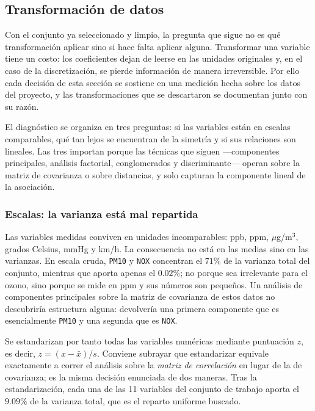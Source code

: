 \subsection{Transformación de datos}

Con el conjunto ya seleccionado y limpio, la pregunta que sigue no es qué
transformación aplicar sino si hace falta aplicar alguna. Transformar una
variable tiene un costo: los coeficientes dejan de leerse en las unidades
originales y, en el caso de la discretización, se pierde información de manera
irreversible. Por ello cada decisión de esta sección se sostiene en una medición
hecha sobre los datos del proyecto, y las transformaciones que se descartaron se
documentan junto con su razón.

El diagnóstico se organiza en tres preguntas: si las variables están en escalas
comparables, qué tan lejos se encuentran de la simetría y si sus relaciones son
lineales. Las tres importan porque las técnicas que siguen ---componentes
principales, análisis factorial, conglomerados y discriminante--- operan sobre la
matriz de covarianza o sobre distancias, y solo capturan la componente lineal de
la asociación.

\subsubsection*{Escalas: la varianza está mal repartida}

Las variables medidas conviven en unidades incomparables: ppb, ppm,
$\mu$g/m$^{3}$, grados Celsius, mmHg y km/h. La consecuencia no está en las
medias sino en las varianzas. En escala cruda, \texttt{PM10} y \texttt{NOX}
concentran el $71\%$ de la varianza total del conjunto, mientras que 
aporta apenas el $0.02\%$; no porque sea irrelevante para el ozono, sino porque
se mide en ppm y sus números son pequeños. Un análisis de componentes principales
sobre la matriz de covarianza de estos datos no descubriría estructura alguna:
devolvería una primera componente que es esencialmente \texttt{PM10} y una
segunda que es \texttt{NOX}.

Se estandarizan por tanto todas las variables numéricas mediante puntuación
$z$, es decir, $z=(x-\bar{x})/s$. Conviene subrayar que estandarizar equivale
exactamente a correr el análisis sobre la \emph{matriz de correlación} en lugar
de la de covarianza; es la misma decisión enunciada de dos maneras. Tras la
estandarización, cada una de las 11 variables del conjunto de trabajo aporta
el $9.09\%$ de la varianza total, que es el reparto uniforme buscado.

